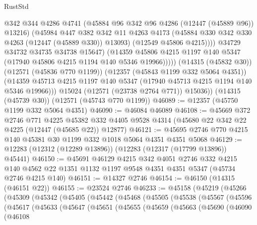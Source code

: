 \begin{lexlean}{RustStd}
\begin{coremodule}
                      @342
                      @344
                      @4286
                      @4741
                      (@45884 @96 @342 @96 @4286 (@12447 (@45889 @96)) @13216)
                      (@45984
                        @447
                        @382
                        @342
                        @11
                        @4263
                        @4173
                        (@45884 @330 @342 @330 @4263 (@12447 (@45889 @330)) @13093)
                        (@12549 @45806 @4215))))
                  @34729
                  @34732
                  @34735
                  @34738
                  @15647)
                (@14359
                  @45806
                  @4215
                  @1197
                  @140
                  @5347
                  (@17940 @45806 @4215 @1194 @140 @5346 @19966)))))
          (@14315 (@45832 @30))
          (@12571 (@45836 @770 @1199))
          (@12357 (@45843 @1199 @332 @5064 @4351))
          (@14359 @45713 @4215 @1197 @140 @5347 (@17940 @45713 @4215 @1194 @140 @5346 @19966)))
        @15024
        (@12571 (@23738 @2764 @771))
        @15036))
    (@14315 (@45739 @30))
    (@12571 (@45743 @770 @1199))
@46089 := @12357 (@45750 @1199 @332 @5064 @4351)
@46090 := @46084 @46089
@46108 := @45669
    @372
    @2746
    @771
    @4225
    @45382
    @332
    @4405
    @9528
    @4314
    (@45680 @22 @342 @22 @4225 (@12447 (@45685 @22)) @12877)
@46121 := @45695 @2746 @770 @4215 @140 @45381 @30 @1199 @332 @1018 @5064 @4351 @4351 @5068
@46129 := @12283 (@12312 (@12289 @13896)) (@12283 (@12317 (@17799 @13896)) @45441)
@46150 := @45691
    @46129
    @4215
    @342
    @4051
    @2746
    @332
    @4215
    @140
    @4562
    @22
    @1351
    @1132
    @1197
    @9548
    @4351
    @4351
    @5347
    (@45734 @2746 @4215 @140)
@46151 := @14327 @2746
@46154 := @46150 (@14315 (@46151 @22))
@46155 := @23524 @2746
@46233 := @45158
    (@45219
      (@45266
        (@45309
          (@45342
            (@45405
              (@45442
                (@45468
                  (@45505
                    (@45538
                      (@45567
                        (@45596
                          (@45617
                            (@45633
                              (@45647
                                (@45651
                                  (@45655
                                    (@45659
                                      (@45663
                                        (@45690
                                          (@46090
                                            (@46108

\end{coremodule}
\end{lexlean}
